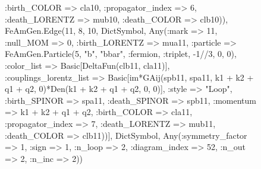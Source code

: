 \documentclass{revtex4}
\begin{document}
\begin{figure}[!htb]
\begin{center}
{:birth_COLOR => cla10, :propagator_index => 6, :death_LORENTZ => mub10, :death_COLOR => clb10)), FeAmGen.Edge(11, 8, 10, Dict{Symbol, Any}(:mark => 11, :null_MOM => 0, :birth_LORENTZ => mua11, :particle => FeAmGen.Particle(5, "b", "bbar", :fermion, :triplet, -1//3, 0, 0), :color_list => Basic[DeltaFun(clb11, cla11)], :couplings_lorentz_list => Basic[im*GAij(spb11, spa11, k1 + k2 + q1 + q2, 0)*Den(k1 + k2 + q1 + q2, 0, 0)], :style => "Loop", :birth_SPINOR => spa11, :death_SPINOR => spb11, :momentum => k1 + k2 + q1 + q2, :birth_COLOR => cla11, :propagator_index => 7, :death_LORENTZ => mub11, :death_COLOR => clb11))], Dict{Symbol, Any}(:symmetry_factor => 1, :sign => 1, :n_loop => 2, :diagram_index => 52, :n_out => 2, :n_inc => 2)) 
}
\end{center}
\end{figure}
\end{document}
